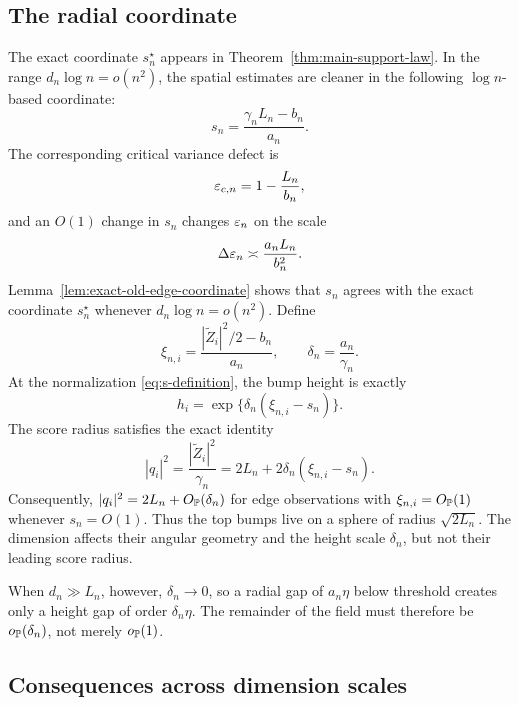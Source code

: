 \subsection{The radial coordinate}

The exact coordinate \(s_n^\star\) appears in
Theorem~\ref{thm:main-support-law}. In the range
\(d_n\log n=o(n^2)\), the spatial estimates are cleaner in the following
\(\log n\)-based coordinate:
\begin{equation}
\label{eq:s-definition}
  s_n
  =
  \frac{\gamma_nL_n-b_n}{a_n}.
\end{equation}
The corresponding critical variance defect is
\begin{equation}
\label{eq:critical-epsilon}
  \varepsilon_{c,n}=1-\frac{L_n}{b_n},
\end{equation}
and an \(O(1)\) change in \(s_n\) changes \(\varepsilon_n\) on the scale
\begin{equation}
\label{eq:epsilon-window}
  \Delta\varepsilon_n
  \asymp
  \frac{a_nL_n}{b_n^2}.
\end{equation}
Lemma~\ref{lem:exact-old-edge-coordinate} shows that \(s_n\) agrees with the
exact coordinate \(s_n^\star\) whenever \(d_n\log n=o(n^2)\). Define
\[
  \xi_{n,i}
  =
  \frac{|\widetilde Z_i|^2/2-b_n}{a_n},
  \qquad
  \delta_n=\frac{a_n}{\gamma_n}.
\]
At the normalization \eqref{eq:s-definition}, the bump height is exactly
\begin{equation}
\label{eq:bump-height-xi}
  h_i
  =
  \exp\{\delta_n(\xi_{n,i}-s_n)\}.
\end{equation}
The score radius satisfies the exact identity
\begin{equation}
\label{eq:universal-score-radius}
  |q_i|^2
  =
  \frac{|\widetilde Z_i|^2}{\gamma_n}
  =2L_n+2\delta_n(\xi_{n,i}-s_n).
\end{equation}
Consequently, $|q_i|^2=2L_n+O_{\mathbb P}(\delta_n)$ for edge observations with
$\xi_{n,i}=O_{\mathbb P}(1)$ whenever $s_n=O(1)$.
Thus the top bumps live on a sphere of radius \(\sqrt{2L_n}\). The dimension
affects their angular geometry and the height scale \(\delta_n\), but not
their leading score radius.

When \(d_n\gg L_n\), however,
\(\delta_n\to0\), so a radial gap of \(a_n\eta\) below threshold creates
only a height gap of order \(\delta_n\eta\). The remainder of the field must
therefore be \(o_{\mathbb P}(\delta_n)\), not merely \(o_{\mathbb P}(1)\).

\subsection{Consequences across dimension scales}
\label{sec:regime-map}

